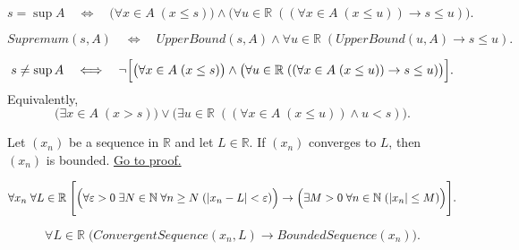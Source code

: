 \begin{remark*}
\[
s = \sup A
\quad\Longleftrightarrow\quad
\bigl(\forall x \in A \; (x \le s)\bigr)
\land
\bigl(\forall u \in \mathbb{R}\; ((\forall x \in A \; (x \le u)) \rightarrow s \le u)\bigr).
\]
\end{remark*}

\begin{remark*}
\[
Supremum(s,A)
\quad\Longleftrightarrow\quad
UpperBound(s,A)
\land
\forall u \in \mathbb{R}\; (UpperBound(u,A) \rightarrow s \le u).
\]
\end{remark*}

\begin{remark*}
\[
s \neq \sup A
\quad\Longleftrightarrow\quad
\neg\Bigl[
\bigl(\forall x \in A \; (x \le s)\bigr)
\land
\bigl(\forall u \in \mathbb{R}\; ((\forall x \in A \; (x \le u)) \rightarrow s \le u)\bigr)
\Bigr].
\]
Equivalently,
\[
\bigl(\exists x \in A \; (x > s)\bigr)
\lor
\bigl(\exists u \in \mathbb{R}\; ((\forall x \in A \; (x \le u)) \land u < s)\bigr).
\]
\end{remark*}






\begin{theorem}
\label{thm:every-convergent-sequence-is-bounded}
Let $(x_n)$ be a sequence in $\mathbb{R}$ and let $L \in \mathbb{R}$. If $(x_n)$ converges
to $L$, then $(x_n)$ is bounded.
\hyperref[prf:every-convergent-sequence-is-bounded]{Go to proof.}
\end{theorem}

\begin{remark*}
\[
\forall x_n \; \forall L \in \mathbb{R}\;
\Biggl[
\Bigl(
\forall \varepsilon > 0 \; \exists N \in \mathbb{N} \; \forall n \ge N \;
(|x_n - L| < \varepsilon)
\Bigr)
\rightarrow
\Bigl(
\exists M > 0 \; \forall n \in \mathbb{N} \; (|x_n| \le M)
\Bigr)
\Biggr].
\]
\end{remark*}

\begin{remark*}
\[
\forall L \in \mathbb{R}\;
\bigl(
ConvergentSequence(x_n,L) \rightarrow BoundedSequence(x_n)
\bigr).
\]
\end{remark*}


